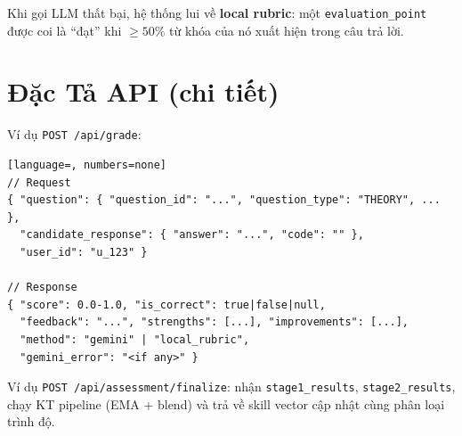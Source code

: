 \begin{center}
\end{center}

Khi gọi LLM thất bại, hệ thống lui về \textbf{local rubric}: một \texttt{evaluation\_point} được coi là ``đạt'' khi $\geq 50\%$ từ khóa của nó xuất hiện trong câu trả lời.

\section{Đặc Tả API (chi tiết)}
\label{apx:api}

Ví dụ \texttt{POST /api/grade}:
\begin{lstlisting}[language=, numbers=none]
// Request
{ "question": { "question_id": "...", "question_type": "THEORY", ... },
  "candidate_response": { "answer": "...", "code": "" },
  "user_id": "u_123" }

// Response
{ "score": 0.0-1.0, "is_correct": true|false|null,
  "feedback": "...", "strengths": [...], "improvements": [...],
  "method": "gemini" | "local_rubric",
  "gemini_error": "<if any>" }
\end{lstlisting}

Ví dụ \texttt{POST /api/assessment/finalize}: nhận \texttt{stage1\_results}, \texttt{stage2\_results}, chạy KT pipeline (EMA + blend) và trả về skill vector cập nhật cùng phân loại trình độ.

